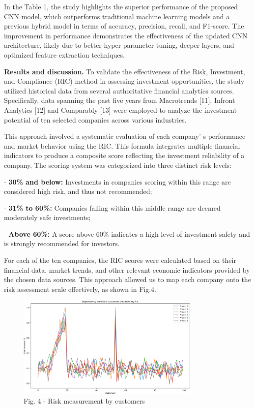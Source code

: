 \begin{multicols}{2}
In the Table 1, the study highlights the superior performance of the
proposed CNN model, which outperforms traditional machine learning
models and a previous hybrid model in terms of accuracy, precision,
recall, and F1-score. The improvement in performance demonstrates the
effectiveness of the updated CNN architecture, likely due to better
hyper parameter tuning, deeper layers, and optimized feature extraction
techniques.

{\bfseries Results and discussion.} To validate the effectiveness of the
Risk, Investment, and Compliance (RIC) method in assessing investment
opportunities, the study utilized historical data from several
authoritative financial analytics sources. Specifically, data spanning
the past five years from Macrotrends {[}11{]}, Infront Analytics
{[}12{]} and Comparably {[}13{]} were employed to analyze the investment
potential of ten selected companies across various industries.

This approach involved a systematic evaluation of each
company' s performance and market behavior using the RIC.
This formula integrates multiple financial indicators to produce a
composite score reflecting the investment reliability of a company. The
scoring system was categorized into three distinct risk levels:

- {\bfseries 30\% and below:} Investments in companies scoring within this
range are considered high risk, and thus not recommended;

- {\bfseries 31\% to 60\%:} Companies falling within this middle range are
deemed moderately safe investments;

- {\bfseries Above 60\%:} A score above 60\% indicates a high level of
investment safety and is strongly recommended for investors.

For each of the ten companies, the RIC scores were calculated based on
their financial data, market trends, and other relevant economic
indicators provided by the chosen data sources. This approach allowed us
to map each company onto the risk assessment scale effectively, as shown
in Fig.4.
\end{multicols}

\begin{figure}[H]
	\centering
	\includegraphics[width=0.8\textwidth]{media/ict2/image12}
	\caption*{Fig. 4 - Risk measurement by customers}
\end{figure}

